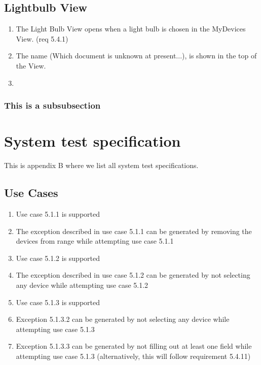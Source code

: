 \documentclass[a4paper]{article}
\newlength{\testlabellength}
\newenvironment{testlist}{\begin{enumerate}[label=\bfseries Test \thesubsection.\arabic* , labelindent=0pt, labelwidth=\testlabellength , leftmargin=2cm]}{\end{enumerate}}
\begin{document}
\begin{appendices}
\subsection{Lightbulb View}
\begin{testlist}
	\item The Light Bulb View opens when a light bulb is chosen in the MyDevices View. (req 5.4.1)
    \item The name (Which document is unknown at present...), is shown in the top of the View.
    \item
\end{testlist}	

\subsubsection{This is a subsubsection}


\newpage

\section{System test specification} \label{appendix:section:systemtest}
This is appendix B where we list all system test specifications.

\subsection{Use Cases}
\begin{testlist}
	\item Use case 5.1.1 is supported
	\item The exception described in use case 5.1.1 can be generated by removing the devices from range while attempting use case 5.1.1
	
	\item Use case 5.1.2 is supported
	\item The exception described in use case 5.1.2 can be generated by not selecting any device while attempting use case 5.1.2
	
	\item Use case 5.1.3 is supported
	\item Exception 5.1.3.2 can be generated by not selecting any device while attempting use case 5.1.3
	\item Exception 5.1.3.3 can be generated by not filling out at least one field while attempting use case	5.1.3 (alternatively, this will follow requirement 5.4.11)
	

\end{testlist}
\end{appendices}
\end{document}
